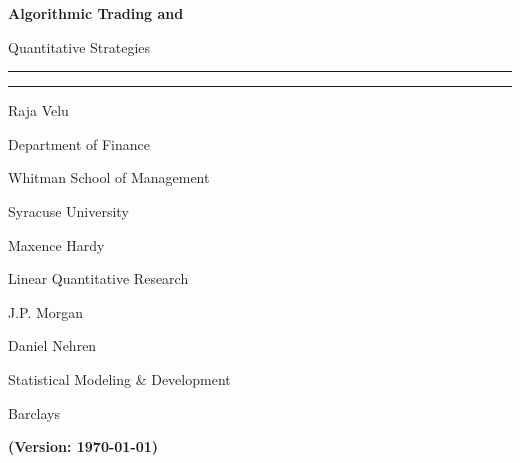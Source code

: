 {\bfseries\Huge Algorithmic Trading and \par Quantitative Strategies}

\noindent\rule{\textwidth}{0.5pt} \par
\vspace{-0.3cm}\noindent\rule{0.25\textwidth}{4pt}

\vspace{0.5cm} 
\begin{minipage}{0.3\textwidth}
\large Raja Velu \par
{\scriptsize
Department of Finance \par
Whitman School of Management \par
Syracuse University \par
}
\end{minipage}%
\begin{minipage}{0.3\textwidth}
\large Maxence Hardy \par
{\scriptsize
Linear Quantitative Research \par
J.P. Morgan \par
}
\end{minipage}%
\begin{minipage}{0.35\textwidth}
\large Daniel Nehren \par
{\scriptsize
Statistical Modeling \& Development \par 
Barclays \par
}
\end{minipage}

\vfill
\begin{center} \Huge {\bfseries (Version: \today)} \end{center}

















